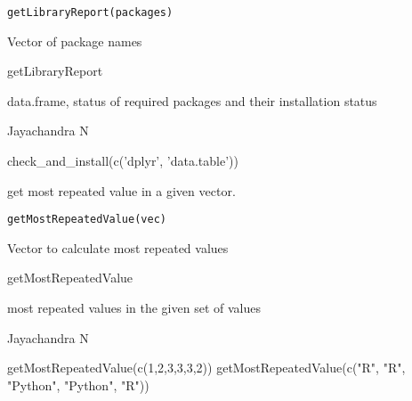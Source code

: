 \documentclass[a4paper]{book}
\begin{document}
%
\begin{Usage}
\begin{verbatim}
getLibraryReport(packages)
\end{verbatim}
\end{Usage}
%
\begin{Arguments}
\begin{ldescription}
\item[\code{packages}] Vector of package names
\end{ldescription}
\end{Arguments}
%
\begin{Details}\relax
getLibraryReport
\end{Details}
%
\begin{Value}
data.frame, status of required packages and their installation status
\end{Value}
%
\begin{Author}\relax
Jayachandra N
\end{Author}
%
\begin{Examples}
\begin{ExampleCode}
check_and_install(c('dplyr', 'data.table'))
\end{ExampleCode}
\end{Examples}
%
\begin{Description}\relax
get most repeated value in a given vector.
\end{Description}
%
\begin{Usage}
\begin{verbatim}
getMostRepeatedValue(vec)
\end{verbatim}
\end{Usage}
%
\begin{Arguments}
\begin{ldescription}
\item[\code{vec}] Vector to calculate most repeated values
\end{ldescription}
\end{Arguments}
%
\begin{Details}\relax
getMostRepeatedValue
\end{Details}
%
\begin{Value}
most repeated values in the given set of values
\end{Value}
%
\begin{Author}\relax
Jayachandra N
\end{Author}
%
\begin{Examples}
\begin{ExampleCode}
getMostRepeatedValue(c(1,2,3,3,3,2))
getMostRepeatedValue(c("R", "R", "Python", "Python", "R"))
\end{ExampleCode}
\end{Examples}
\end{document}

